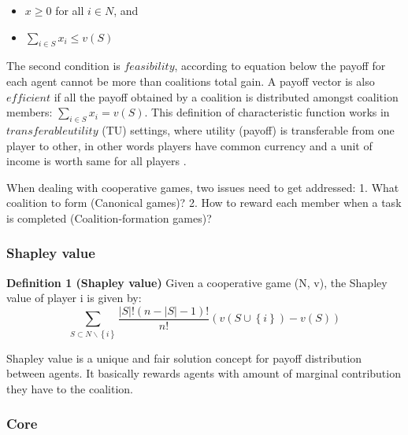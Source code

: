 \documentclass[10pt, conference, compsocconf]{IEEEtran}
\theoremstyle{plain}
\theoremstyle{definition}
\begin{document}
\begin{itemize}
	\item $x \geq 0$ for all $i \in N$, and
	\item $\sum_{i \in S} x_i \leq v(S)$
\end{itemize}

The second condition is $feasibility$, according to equation below the payoff for each agent cannot be more than coalitions total gain. A payoff vector is also $efficient$ if all the payoff obtained by a coalition is distributed amongst coalition members: $\sum_{i \in S} x_i = v(S)$. This definition of characteristic function works in $transferable utility$ (TU) settings, where utility (payoff) is transferable from one player to other, in other words players have common currency and a unit of income is worth same for all players \cite{myerson1991game}.

When dealing with cooperative games, two issues need to get addressed: 1. What coalition to form (Canonical games)? 2. How to reward each member when a task is completed (Coalition-formation games)?

\subsubsection{Shapley value}

{\bf Definition 1 (Shapley value)} Given a cooperative game (N, v), the Shapley value of player i is given by\cite{shapley_value}: 
\begin{equation}\label{eq:shapley}
\sum_{S \subset N \backslash \left\{i\right\} } \frac{|S|! (n-|S|-1)!}{n!} (v(S \cup \left\{i\right\}) - v(S))
\end{equation}

Shapley value is a unique and fair solution concept for payoff distribution between agents. It basically rewards agents with amount of marginal contribution they have to the coalition.

\subsubsection{Core}
\end{document}
